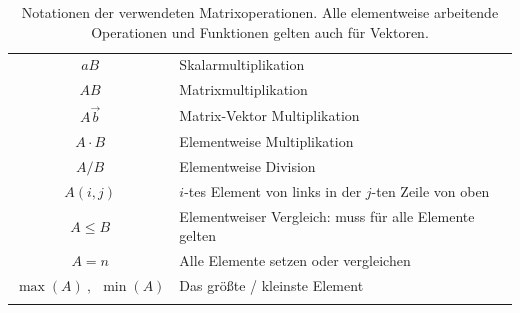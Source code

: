  \begin{table}[H]
  \begin{tabular}{cl}
   $ aB $ 			& Skalarmultiplikation \\ 
   $AB $ 			& Matrixmultiplikation \\
   $A\vec{b}$ 			& Matrix-Vektor Multiplikation \\
   $A \cdot B $ 		& Elementweise Multiplikation \\ 
   $A / B $ 			& Elementweise Division \\ 
   $A(i,j) $ 			& $i$-tes Element von links in der $j$-ten Zeile von oben \\ 
   $A \leq B $           	& Elementweiser Vergleich: muss für alle Elemente gelten\\
   $A=n$			& Alle Elemente setzen oder vergleichen\\
   $\max{(A)}\ ,\ \ \min{(A)}$	& Das größte / kleinste Element \\
   
   \caption[Matrix- und Vektoroperationen]{\label{operationen} Notationen der verwendeten Matrixoperationen. Alle elementweise arbeitende Operationen und Funktionen gelten auch für Vektoren.}

  \end{tabular}
 \end{table}



